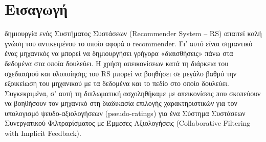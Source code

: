 
\chapter*{Εισαγωγή}
\lettrine[findent=2pt]{}{} δημιουργία ενός Συστήματος Συστάσεων (Recommender System – RS) απαιτεί καλή γνώση του αντικειμένου το οποίο αφορά ο recommender. Γι’ αυτό είναι σημαντικό ένας μηχανικός να μπορεί να δημιουργήσει γρήγορα «διαισθήσεις» πάνω στα δεδομένα στα οποία δουλεύει. Η χρήση απεικονίσεων κατά τη διάρκεια του σχεδιασμού και υλοποίησης του RS μπορεί να βοηθήσει σε μεγάλο βαθμό την εξοικείωση του μηχανικού με τα δεδομένα και το πεδίο στο οποίο δουλεύει. Συγκεκριμένα, σ’ αυτή τη διπλωματική ασχοληθήκαμε με απεικονίσεις που σκοπεύουν να βοηθήσουν τον μηχανικό στη διαδικασία επιλογής χαρακτηριστικών για τον υπολογισμό ψευδο-αξιολογήσεων (pseudo-ratings) για ένα Σύστημα Συστάσεων Συνεργατικού Φιλτραρίσματος με Έμμεσες Αξιολογήσεις (Collaborative Filtering with Implicit Feedback). 
